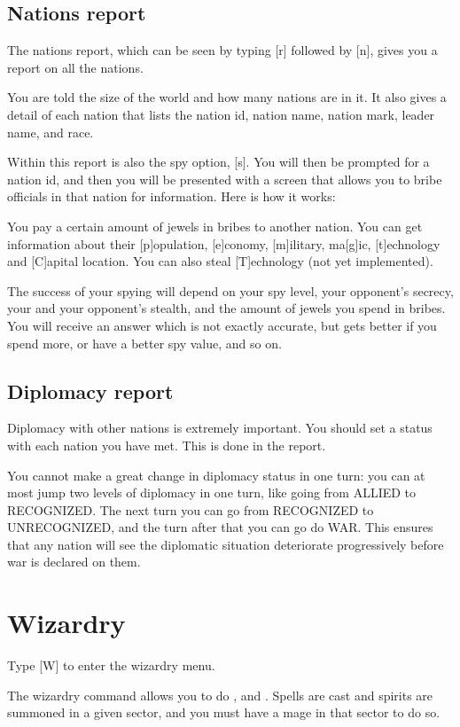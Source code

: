 \subsection{Nations report}
The nations report, which can be seen by typing [r] followed by [n],
gives you a report on all the nations.

You are told the size of the world and how many nations are in it. It also 
gives a detail of each nation that lists the nation id, nation name, nation 
mark, leader name, and race.

Within this report is also the spy option, [s].  You will then be
prompted for a nation id, and then you will be presented with a screen
that allows you to bribe officials in that nation for information.
Here is how it works:

You pay a certain amount of jewels in bribes to another nation.  You
can get information about their [p]opulation, [e]conomy, [m]ilitary,
ma[g]ic, [t]echnology and [C]apital location.  You can also steal
[T]echnology (not yet implemented).

The success of your spying will depend on your spy level, your
opponent's secrecy, your and your opponent's stealth, and the amount
of jewels you spend in bribes.  You will receive an answer which is
not exactly accurate, but gets better if you spend more, or have a
better spy value, and so on.

\subsection{Diplomacy report}
Diplomacy with other nations is extremely important.  You should set a
status with each nation you have met.  This is done in the
 report.

You cannot make a great change in diplomacy status in one turn: you
can at most jump two levels of diplomacy in one turn, like going from
ALLIED to RECOGNIZED.  The next turn you can go from RECOGNIZED to
UNRECOGNIZED, and the turn after that you can go do WAR.  This ensures
that any nation will see the diplomatic situation deteriorate
progressively before war is declared on them.

\section{Wizardry}
Type [W] to enter the wizardry menu.

The wizardry command allows you to do ,
 and .  Spells are cast and
spirits are summoned in a given sector, and you must have a mage in
that sector to do so.

